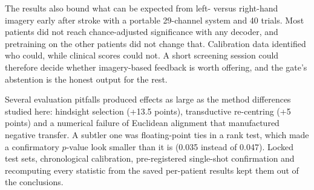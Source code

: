 The results also bound what can be expected from left- versus right-hand imagery early after stroke with a portable 29-channel system and 40 trials. Most patients did not reach chance-adjusted significance with any decoder, and pretraining on the other patients did not change that. Calibration data identified who could, while clinical scores could not. A short screening session could therefore decide whether imagery-based feedback is worth offering, and the gate's abstention is the honest output for the rest.

Several evaluation pitfalls produced effects as large as the method differences studied here: hindsight selection (+13.5 points), transductive re-centring (+5 points) and a numerical failure of Euclidean alignment that manufactured negative transfer. A subtler one was floating-point ties in a rank test, which made a confirmatory $p$-value look smaller than it is (0.035 instead of 0.047). Locked test sets, chronological calibration, pre-registered single-shot confirmation and recomputing every statistic from the saved per-patient results kept them out of the conclusions.

